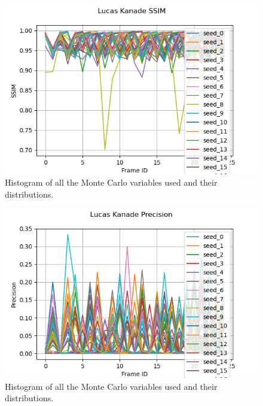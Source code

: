 \documentclass[11pt, conference, letterpaper]{IEEEtran}
\begin{document}
\begin{figure}[h]
    \centering
    \includegraphics[width=\linewidth]{mc_images/mc_lk_ssim.png}
    \caption{Histogram of all the Monte Carlo variables used and their distributions.}
    \label{fig:mc_lk_ssim}
\end{figure}

\begin{figure}[h]
    \centering
    \includegraphics[width=\linewidth]{mc_images/mc_lk_precision.png}
    \caption{Histogram of all the Monte Carlo variables used and their distributions.}
    \label{fig:mc_lk_prec}
\end{figure}
\end{document}
